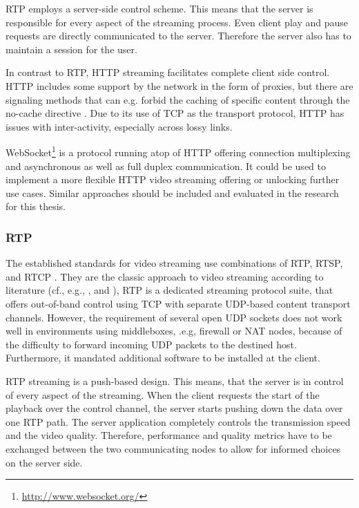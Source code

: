 \gls{RTP} employs a server-side control scheme. This means that the server is responsible for every aspect of the streaming process. Even client play and pause requests are directly communicated to the server. Therefore the server also has to maintain a session for the user.

In contrast to \gls{RTP}, \gls{HTTP} streaming facilitates complete client side control. HTTP includes some support by the network in the form of proxies, but there are signaling methods that can e.g. forbid the caching of specific content through the no-cache directive \cite{rfc2616}. Due to its use of \gls{TCP} as the transport protocol, \gls{HTTP} has issues with inter-activity, especially across lossy links.

WebSocket\footnote{\url{http://www.websocket.org/}} \cite{ietf2011websocket} is a protocol running atop of \gls{HTTP} offering connection multiplexing and asynchronous as well as full duplex communication. It could be used to implement a more flexible \gls{HTTP} video streaming offering or unlocking further use cases. Similar approaches should be included and evaluated in the research for this thesis.


\subsubsection{RTP}


The established standards for video streaming use combinations of \gls{RTP}, \gls{RTSP}, and \gls{RTCP} \cite{rfc3550, rfc2326}. They are the classic approach to video streaming according to literature (cf., e.g., \cite[p.~589ff]{kurose2008computer}, and \cite[p.~426ff]{peterson2007computer}), \gls{RTP} is a dedicated streaming protocol suite, that offers out-of-band control using TCP with separate \gls{UDP}-based content transport channels. However, the requirement of several open \gls{UDP} sockets does not work well in environments using middleboxes, .e.g, firewall or \gls{NAT} nodes, because of the difficulty to forward incoming \gls{UDP} packets to the destined host. Furthermore, it mandated additional software to be installed at the client. 

RTP streaming is a push-based design. This means, that the server is in control of every aspect of the streaming. When the client requests the start of the playback over the control channel, the server starts pushing down the data over one RTP path. The server application completely controls the transmission speed and the video quality. Therefore, performance and quality metrics have to be exchanged between the two communicating nodes to allow for informed choices on the server side.

